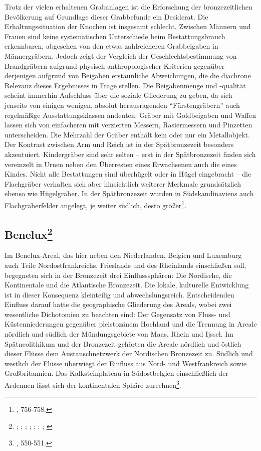 \documentclass[openany,twoside,twocolumn]{book}
\let\rmarkdownfootnote\footnote%
\def\footnote{\protect\rmarkdownfootnote}
\begin{document}
Trotz der vielen erhaltenen Grabanlagen ist die Erforschung der bronzezeitlichen Bevölkerung auf Grundlage dieser Grabbefunde ein Desiderat. Die Erhaltungssituation der Knochen ist insgesamt schlecht. Zwischen Männern und Frauen sind keine systematischen Unterschiede beim Bestattungsbrauch erkennbaren, abgesehen von den etwas zahlreicheren Grabbeigaben in Männergräbern. Jedoch zeigt der Vergleich der Geschlechtsbestimmung von Brandgräbern aufgrund physisch-anthropologischer Kriterien gegenüber derjenigen aufgrund von Beigaben erstaunliche Abweichungen, die die diachrone Relevanz dieses Ergebnisses in Frage stellen. Die Beigabenmenge und -qualität scheint immerhin Aufschluss über die soziale Gliederung zu geben, da sich jenseits von einigen wenigen, absolut herausragenden ``Fürstengräbern'' auch regelmäßige Ausstattungsklassen andeuten: Gräber mit Goldbeigaben und Waffen lassen sich von einfacheren mit verzierten Messern, Rasiermessern und Pinzetten unterscheiden. Die Mehrzahl der Gräber enthält kein oder nur ein Metallobjekt. Der Kontrast zwischen Arm und Reich ist in der Spätbronzezeit besonders akzentuiert. Kindergräber sind sehr selten -- erst in der Spätbronzezeit finden sich vereinzelt in Urnen neben den Überresten eines Erwachsenen auch die eines Kindes. Nicht alle Bestattungen sind überhügelt oder in Hügel eingebracht -- die Flachgräber verhalten sich aber hinsichtlich weiterer Merkmale grundsätzlich ebenso wie Hügelgräber. In der Spätbronzezeit wurden in Südskandinaviens auch Flachgräberfelder angelegt, je weiter südlich, desto größer\footnote{\textcite{thrane_scandinavia_2013}, 756-758.}.

\hypertarget{benelux}{%
\subsection[Benelux]{\texorpdfstring{Benelux\footnote{\textcite{beek_circles_2014}; \textcite{bourgeois_bronze_2008}; \textcite{drenth_mounds_2005}; \textcite{fokkens_bronze_2013}; \textcite{fontijn_sacrificial_2002}; \textcite{de_reu_land_2012}; \textcite{lohof_grafritueel_1991}; \textcite{lohof_tradition_1994}}}{Benelux}}\label{benelux}}

Im Benelux-Areal, das hier neben den Niederlanden, Belgien und Luxemburg auch Teile Nordostfrankreichs, Frieslands und des Rheinlands einschließen soll, begegneten sich in der Bronzezeit drei Einflusssphären: Die Nordische, die Kontinentale und die Atlantische Bronzezeit. Die lokale, kulturelle Entwicklung ist in dieser Konsequenz kleinteilig und abwechslungsreich. Entscheidenden Einfluss darauf hatte die geographische Gliederung des Areals, wobei zwei wesentliche Dichotomien zu beachten sind: Der Gegensatz von Fluss- und Küstenniederungen gegenüber pleistozänem Hochland und die Trennung in Areale nördlich und südlich der Mündungsgebiete von Maas, Rhein und Ijssel. Im Spätneolithikum und der Bronzezeit gehörten die Areale nördlich und östlich dieser Flüsse dem Austauschnetzwerk der Nordischen Bronzezeit zu. Südlich und westlich der Flüsse überwiegt der Einfluss aus Nord- und Westfrankreich sowie Großbritannien. Das Kalksteinplateau in Südostbelgien einschließlich der Ardennen lässt sich der kontinentalen Sphäre zurechnen\footnote{\textcite{fokkens_bronze_2013}, 550-551.}.
\end{document}
